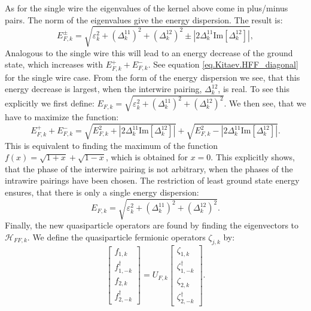As for the single wire the eigenvalues of the kernel above come in plus/minus pairs. The norm of the eigenvalues give the energy dispersion. The result is:
\begin{equation}
E^{\pm}_{F,k} = \sqrt{\varepsilon^2_k + \left(\Delta^{11}_k\right)^2 + \left(\Delta^{12}_k\right)^2 \pm \left|2\Delta^{11}_k\text{Im}\left[\Delta^{12}_k\right]\right|}, 
\end{equation} 
Analogous to the single wire this will lead to an energy decrease of the ground state, which increases with $E^{+}_{F,k} + E^{-}_{F,k}$. See equation \eqref{eq.Kitaev.HFF_diagonal} for the single wire case. From the form of the energy dispersion we see, that this energy decrease is largest, when the interwire pairing, $\Delta^{12}_k$, is real. To see this explicitly we first define: $E_{F,k} = \sqrt{\varepsilon^2_k + \left(\Delta^{11}_k\right)^2 + \left(\Delta^{12}_k\right)^2}$. We then see, that we have to maximize the function:
\begin{equation}
E^{+}_{F,k} + E^{-}_{F,k} = \sqrt{E^2_{F,k} + \left|2\Delta^{11}_k\text{Im}\left[\Delta^{12}_k\right]\right|} + \sqrt{E^2_{F,k} - \left|2\Delta^{11}_k\text{Im}\left[\Delta^{12}_k\right]\right|}. \nonumber
\end{equation}
This is equivalent to finding the maximum of the function $f(x) = \sqrt{1 + x} + \sqrt{1 - x}$, which is obtained for $x = 0$. This explicitly shows, that the phase of the interwire pairing is not arbitrary, when the phases of the intrawire pairings have been chosen. The restriction of least ground state energy ensures, that there is only a single energy dispersion:
\begin{equation}
E_{F,k} = \sqrt{\varepsilon^2_k + \left(\Delta^{11}_k\right)^2 + \left(\Delta^{12}_k\right)^2}.
\label{eq.energydispersiontwowires}
\end{equation}
Finally, the new quasiparticle operators are found by finding the eigenvectors to $\mathcal{H}_{FF,k}$. We define the quasiparticle fermionic operators $\zeta_{j,k}$ by:
\begin{equation}
\begin{bmatrix} f_{1,k} \\ f^\dagger_{1,-k} \\ f_{2,k} \\ f^\dagger_{2,-k} \end{bmatrix} = U_{F,k}\begin{bmatrix} \zeta_{1,k} \\ \zeta^{\dagger}_{1,-k} \\ \zeta_{2,k} \\ \zeta^{\dagger}_{2,-k} \end{bmatrix}.
\label{eq.zetaoperatorstwowiresdefinition}
\end{equation} 
